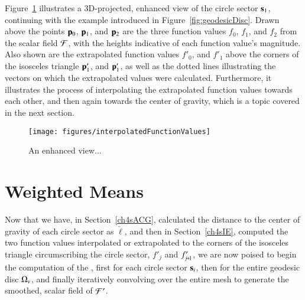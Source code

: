 Figure~\ref{fig:interpolatedFunctionValues} illustrates a 3D-projected, enhanced view of the circle sector $\mathbf{s}_1$, continuing with the example introduced in Figure~\ref{fig:geodesicDisc}. Drawn above the points $\mathbf{p}_0$, $\mathbf{p}_1$, and $\mathbf{p}_2$ are the three function values $f_0$, $f_1$, and $f_2$ from the scalar field $\mathcal{F}$, with the heights indicative of each function value's magnitude. Also shown are the extrapolated function values $f'_0$, and $f'_1$ above the corners of the isosceles triangle $\mathbf{p}'_1$, and $\mathbf{p}'_1$, as well as the dotted lines illustrating the vectors on which the extrapolated values were calculated. Furthermore, it illustrates the process of interpolating the extrapolated function values towards each other, and then again towards the center of gravity, which is a topic covered in the next section.

\begin{figure}[ht]
\ffigbox
	{\texttt{[image: figures/interpolatedFunctionValues]}}
	{\caption[Interpolation of Function Values toward the Center of Gravity]{An enhanced view...}\label{fig:interpolatedFunctionValues}}
\end{figure}

%
%
%
%
\section{Weighted Means}
\label{ch4sWM}
Now that we have, in Section~\ref{ch4sACG}, calculated the distance to the center of gravity of each circle sector as $\check{\ell}$, and then in Section~\ref{ch4sIE}, computed the two function values interpolated or extrapolated to the corners of the isosceles triangle circumscribing the circle sector, $f'_j$ and $f'_{\sjpo}$, we are now poised to begin the computation of the , first for each circle sector $\mathbf{s}_i$, then for the entire geodesic disc $\Omega_v$, and finally iteratively convolving  over the entire mesh to generate the smoothed, scalar field of  $\mathcal{F}'$.

